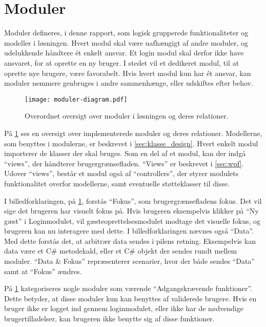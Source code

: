 \section{Moduler}
\label{sec:moduler}

Moduler defineres, i denne rapport, som logisk grupperede funktionaliteter og modeller i løsningen. Hvert modul skal være uafhængigt af andre moduler, og udelukkende håndtere ét enkelt ansvar. Et login modul skal derfor ikke have ansvaret, for at oprette en ny bruger. I stedet vil et dedikeret modul, til at oprette nye brugere, være favorabelt. Hvis hvert modul kun har ét ansvar, kan moduler nemmere genbruges i andre sammenhænge, eller udskiftes efter behov.

\begin{figure}
  \centering
  \texttt{[image: moduler-diagram.pdf]}
  \caption{Overordnet oversigt over moduler i løsningen og deres relationer.}
  \label{fig:mod}
\end{figure}

På \cref{fig:mod} ses en oversigt over implementerede moduler og deres relationer. Modellerne, som benyttes i modulerne, er beskrevet i \cref{sec:klasse_design}. Hvert enkelt modul importerer de klasser der skal bruges. Som en del af et modul, kan der indgå \enquote{views}, der håndterer brugergrænsefladen. \enquote{Views} er beskrevet i \cref{sec:wpf}. Udover \enquote{views}, består et modul også af \enquote{controllers}, der styrer modulets funktionalitet overfor modellerne, samt eventuelle støtteklasser til disse.

I billedforklaringen, på \cref{fig:mod}, forstås \enquote{Fokus}, som brugergrænsefladens fokus. Det vil sige det brugeren har visuelt fokus på. Hvis brugeren eksempelvis klikker på \enquote{Ny gæst} i Loginmodulet, vil gæsteoprettelsesmodulet modtage det visuelle fokus, og brugeren kan nu interagere med dette. I billedforklaringen nævnes også \enquote{Data}. Med dette forstås det, at arbitrær data sendes i pilens retning. Eksempelvis kan data være et C\# metodekald, eller et C\# objekt der sendes rundt mellem moduler. \enquote{Data \& Fokus} repræsenterer scenarier, hvor der både sendes \enquote{Data} samt at \enquote{Fokus} ændres.

På \cref{fig:mod} kategoriseres nogle moduler som værende \enquote{Adgangskrævende funktioner}. Dette betyder, at disse moduler kun kan benyttes af validerede brugere. Hvis en bruger ikke er logget ind gennem loginmodulet, eller ikke har de nødvendige brugertilladelser, kan brugeren ikke benytte sig af disse funktioner.


